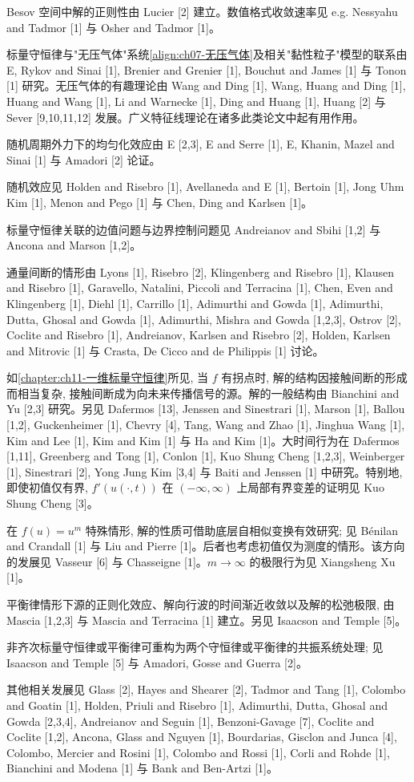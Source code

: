 \documentclass[../../main.tex]{subfiles}
\begin{document}
Besov 空间中解的正则性由 Lucier [2] 建立。数值格式收敛速率见 e.g. Nessyahu and Tadmor [1] 与 Osher and Tadmor [1]。

标量守恒律与"无压气体"系统\eqref{align:ch07-无压气体}及相关"黏性粒子"模型的联系由 E, Rykov and Sinai [1], Brenier and Grenier [1], Bouchut and James [1] 与 Tonon [1] 研究。无压气体的有趣理论由 Wang and Ding [1], Wang, Huang and Ding [1], Huang and Wang [1], Li and Warnecke [1], Ding and Huang [1], Huang [2] 与 Sever [9,10,11,12] 发展。广义特征线理论在诸多此类论文中起有用作用。

随机周期外力下的均匀化效应由 E [2,3], E and Serre [1], E, Khanin, Mazel and Sinai [1] 与 Amadori [2] 论证。

随机效应见 Holden and Risebro [1], Avellaneda and E [1], Bertoin [1], Jong Uhm Kim [1], Menon and Pego [1] 与 Chen, Ding and Karlsen [1]。

标量守恒律关联的边值问题与边界控制问题见 Andreianov and Sbihi [1,2] 与 Ancona and Marson [1,2]。

通量间断的情形由 Lyons [1], Risebro [2], Klingenberg and Risebro [1], Klausen and Risebro [1], Garavello, Natalini, Piccoli and Terracina [1], Chen, Even and Klingenberg [1], Diehl [1], Carrillo [1], Adimurthi and Gowda [1], Adimurthi, Dutta, Ghosal and Gowda [1], Adimurthi, Mishra and Gowda [1,2,3], Ostrov [2], Coclite and Risebro [1], Andreianov, Karlsen and Risebro [2], Holden, Karlsen and Mitrovic [1] 与 Crasta, De Cicco and de Philippis [1] 讨论。

如\cref{chapter:ch11-一维标量守恒律}所见, 当 $f$ 有拐点时, 解的结构因接触间断的形成而相当复杂, 接触间断成为向未来传播信号的源。解的一般结构由 Bianchini and Yu [2,3] 研究。另见 Dafermos [13], Jenssen and Sinestrari [1], Marson [1], Ballou [1,2], Guckenheimer [1], Chevry [4], Tang, Wang and Zhao [1], Jinghua Wang [1], Kim and Lee [1], Kim and Kim [1] 与 Ha and Kim [1]。大时间行为在 Dafermos [1,11], Greenberg and Tong [1], Conlon [1], Kuo Shung Cheng [1,2,3], Weinberger [1], Sinestrari [2], Yong Jung Kim [3,4] 与 Baiti and Jenssen [1] 中研究。特别地, 即使初值仅有界, $f'(u(\cdot,t))$ 在 $(-\infty,\infty)$ 上局部有界变差的证明见 Kuo Shung Cheng [3]。


在 $f(u)=u^m$ 特殊情形, 解的性质可借助底层自相似变换有效研究; 见 Bénilan and Crandall [1] 与 Liu and Pierre [1]。后者也考虑初值仅为测度的情形。该方向的发展见 Vasseur [6] 与 Chasseigne [1]。$m\to\infty$ 的极限行为见 Xiangsheng Xu [1]。

平衡律情形下源的正则化效应、解向行波的时间渐近收敛以及解的松弛极限, 由 Mascia [1,2,3] 与 Mascia and Terracina [1] 建立。另见 Isaacson and Temple [5]。

非齐次标量守恒律或平衡律可重构为两个守恒律或平衡律的共振系统处理; 见 Isaacson and Temple [5] 与 Amadori, Gosse and Guerra [2]。

其他相关发展见 Glass [2], Hayes and Shearer [2], Tadmor and Tang [1], Colombo and Goatin [1], Holden, Priuli and Risebro [1], Adimurthi, Dutta, Ghosal and Gowda [2,3,4], Andreianov and Seguin [1], Benzoni-Gavage [7], Coclite and Coclite [1,2], Ancona, Glass and Nguyen [1], Bourdarias, Gisclon and Junca [4], Colombo, Mercier and Rosini [1], Colombo and Rossi [1], Corli and Rohde [1], Bianchini and Modena [1] 与 Bank and Ben-Artzi [1]。
\end{document}
